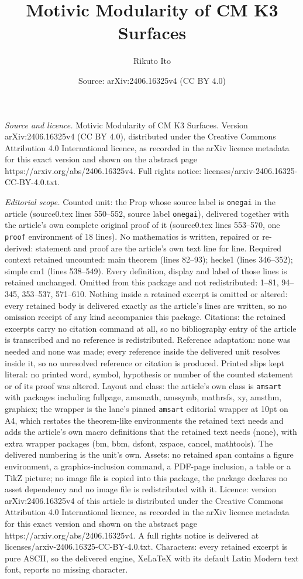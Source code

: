 \documentclass[10pt,a4paper]{amsart}
\title[Motivic Modularity of CM K3 Surfaces]{Motivic Modularity of CM K3 Surfaces}
\author{Rikuto Ito}
\date{Source: arXiv:2406.16325v4 (CC BY 4.0)}
\begin{document}
\maketitle

\noindent\emph{Source and licence.} Motivic Modularity of CM K3 Surfaces. Version arXiv:2406.16325v4 (CC BY 4.0), distributed under the Creative Commons Attribution 4.0 International licence, as recorded in the arXiv licence metadata for this exact version and shown on the abstract page https://arxiv.org/abs/2406.16325v4. Full rights notice: licenses/arxiv-2406.16325-CC-BY-4.0.txt.\par\smallskip

\noindent\textit{Editorial scope.} Counted unit: the Prop whose source label is \texttt{onegai} in the article (source0.tex lines 550--552, source label \texttt{onegai}), delivered together with the article's own complete original proof of it (source0.tex lines 553--570, one \texttt{proof} environment of 18 lines). No mathematics is written, repaired or re-derived: statement and proof are the article's own text line for line. Required context retained uncounted: main theorem (lines 82--93); hecke1 (lines 346--352); simple cm1 (lines 538--549). Every definition, display and label of those lines is retained unchanged. Omitted from this package and not redistributed: 1--81, 94--345, 353--537, 571--610. Nothing inside a retained excerpt is omitted or altered: every retained body is delivered exactly as the article's lines are written, so no omission receipt of any kind accompanies this package. Citations: the retained excerpts carry no citation command at all, so no bibliography entry of the article is transcribed and no reference is redistributed. Reference adaptation: none was needed and none was made; every reference inside the delivered unit resolves inside it, so no unresolved reference or citation is produced. Printed slips kept literal: no printed word, symbol, hypothesis or number of the counted statement or of its proof was altered. Layout and class: the article's own class is \texttt{amsart} with packages including fullpage, amsmath, amssymb, mathrsfs, xy, amsthm, graphicx; the wrapper is the lane's pinned \texttt{amsart} editorial wrapper at 10pt on A4, which restates the theorem-like environments the retained text needs and adds the article's own macro definitions that the retained text needs (none), with extra wrapper packages (bm, bbm, dsfont, xspace, cancel, mathtools). The delivered numbering is the unit's own. Assets: no retained span contains a figure environment, a graphics-inclusion command, a PDF-page inclusion, a table or a TikZ picture; no image file is copied into this package, the package declares no asset dependency and no image file is redistributed with it. Licence: version arXiv:2406.16325v4 of this article is distributed under the Creative Commons Attribution 4.0 International licence, as recorded in the arXiv licence metadata for this exact version and shown on the abstract page https://arxiv.org/abs/2406.16325v4. A full rights notice is delivered at licenses/arxiv-2406.16325-CC-BY-4.0.txt. Characters: every retained excerpt is pure ASCII, so the delivered engine, XeLaTeX with its default Latin Modern text font, reports no missing character.
\end{document}
